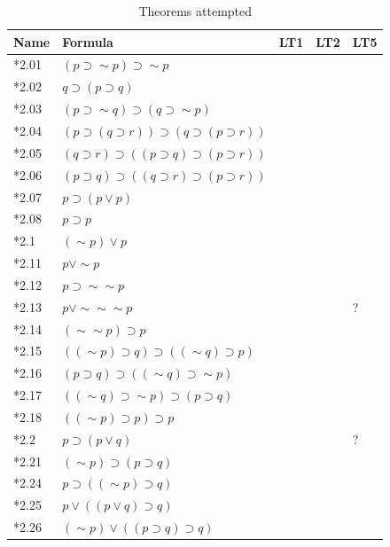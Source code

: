 \documentclass[journal]{IEEEtran}
\begin{document}
\begin{table}[h]
\centering
\caption{Theorems attempted}
\label{tab:results}
\begin{tabular}{lllll}
\toprule
\textbf{Name} & \textbf{Formula} & \textbf{LT1} & \textbf{LT2}\cite{LT1957} & \textbf{LT5} \\
\midrule
*2.01 & $(p \supset \sim p) \supset \sim p $ & \Y & \Y \cite[p.~219]{LT1957} & \Y \\
*2.02 & $q \supset (p \supset q) $ & \Y & \Y \cite[p.~224]{LT1957} & \Y \\
*2.03 & $(p \supset \sim q) \supset (q \supset \sim p) $ & \Y & \ & \Y \\
*2.04 & $(p \supset (q \supset r)) \supset (q \supset (p \supset r)) $ & \Y & \ & \Y \\
*2.05 & $(q \supset r) \supset ((p \supset q) \supset (p \supset r)) $ & \Y& \ & \Y \\
*2.06 & $(p \supset q) \supset ((q \supset r) \supset (p \supset r)) $ & \Y& \ & \Y \\
*2.07 & $p \supset (p \vee p) $ & \Y & \Y \cite[p.~226]{LT1957} & \Y \\
*2.08 & $p \supset p $ & \Y & \ & \Y \\
*2.1 & $ (\sim p) \vee p $ & \Y & \ & \Y \\
*2.11 & $p \vee \sim p $ & \Y & \ & \Y \\
*2.12 & $p \supset \sim \sim p $ & \Y & \ & \Y \\
*2.13 & $p \vee \sim \sim \sim p $ & \N & \N \cite[p.~222]{LT1957} & ? \\
*2.14 & $ (\sim \sim p) \supset p $ & \Y & \ & \Y \\
*2.15 & $( (\sim p )\supset q) \supset ( (\sim q) \supset p) $ & \N & \ & \N \\
*2.16 & $(p \supset q) \supset ( (\sim q) \supset \sim p) $ & \N & \ & \N \\
*2.17 & $( (\sim q) \supset \sim p) \supset (p \supset q) $ & \N & \Y \cite[p.~228]{LT1957} & \N \\
*2.18 & $( (\sim p )\supset p) \supset p $ & \Y & \ & \Y \\
*2.2 & $p \supset (p \vee q) $ & \Y & \ & ? \\
*2.21 & $ (\sim p) \supset (p \supset q) $ & \Y & \ & \Y \\
*2.24 & $p \supset ( (\sim p) \supset q) $ & \Y & \ & \Y \\
*2.25 & $p \vee ((p \vee q) \supset q) $ & \Y & \ & \N \\
*2.26 & $ (\sim p) \vee ((p \supset q) \supset q) $ & \Y & \ & \Y \\

\end{tabular}
\end{table}
\end{document}

